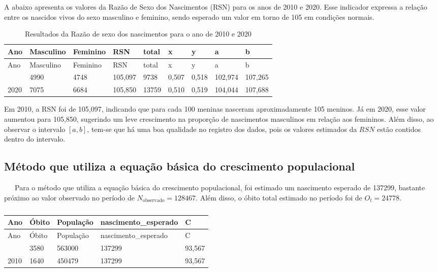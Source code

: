 \documentclass[
  12pt,
  a4paper,
]{scrreprt}
\begin{document}
A abaixo apresenta os valores da Razão de Sexo dos Nascimentos (RSN)
para os anos de 2010 e 2020. Esse indicador expressa a relação entre os
nascidos vivos do sexo masculino e feminino, sendo esperado um valor em
torno de 105 em condições normais.

\begin{longtable}[]{@{}lllllllll@{}}
\caption{Resultados da Razão de sexo dos nascimentos para o ano de 2010
e 2020}\label{T_c7532}\tabularnewline
\toprule\noalign{}
Ano & Masculino & Feminino & RSN & total & x & y & a & b \\
\midrule\noalign{}
\endfirsthead
\toprule\noalign{}
Ano & Masculino & Feminino & RSN & total & x & y & a & b \\
\midrule\noalign{}
\endhead
\bottomrule\noalign{}
\endlastfoot
2010 & 4990 & 4748 & 105,097 & 9738 & 0,507 & 0,518 & 102,974 &
107,265 \\
2020 & 7075 & 6684 & 105,850 & 13759 & 0,510 & 0,519 & 104,044 &
107,688 \\
\end{longtable}

Em 2010, a RSN foi de 105,097, indicando que para cada 100 meninas
nasceram aproximadamente 105 meninos. Já em 2020, esse valor aumentou
para 105,850, sugerindo um leve crescimento na proporção de nascimentos
masculinos em relação aos femininos. Além disso, ao observar o intervalo
\(\left[a, b\right]\), tem-se que há uma boa qualidade no registro dos
dados, pois os valores estimados da \(RSN\) estão contidos dentro do
intervalo.

\subsection{Método que utiliza a equação básica do crescimento
populacional}\label{muxe9todo-que-utiliza-a-equauxe7uxe3o-buxe1sica-do-crescimento-populacional-1}

~~~Para o método que utiliza a equação básica do crescimento
populacional, foi estimado um nascimento esperado de 137299, bastante
próximo ao valor observado no período de
\(N_{\text{observado}} = 128467\). Além disso, o óbito total estimado no
período foi de \(O_t = 24778\).

\begin{longtable}[]{@{}lllll@{}}
\caption{}\label{T_dc1fd}\tabularnewline
\toprule\noalign{}
Ano & Óbito & População & nascimento\_esperado & C \\
\midrule\noalign{}
\endfirsthead
\toprule\noalign{}
Ano & Óbito & População & nascimento\_esperado & C \\
\midrule\noalign{}
\endhead
\bottomrule\noalign{}
\endlastfoot
2020 & 3580 & 563000 & 137299 & 93,567 \\
2010 & 1640 & 450479 & 137299 & 93,567 \\
\end{longtable}
\end{document}
